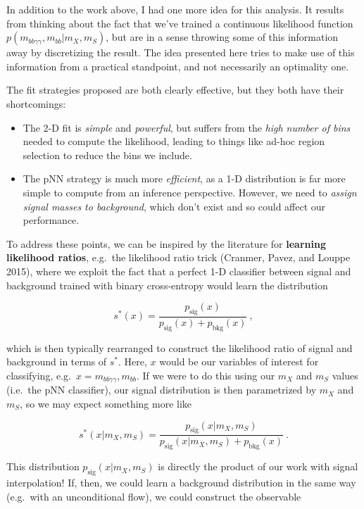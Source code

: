 \documentclass[
  11pt,
  numbers=noendperiod]{book}
\providecommand{\tightlist}{%
  \setlength{\itemsep}{0pt}\setlength{\parskip}{0pt}}\usepackage{longtable,booktabs,array}
\begin{document}
In addition to the work above, I had one more idea for this analysis. It
results from thinking about the fact that we've trained a continuous
likelihood function \(p(m_{bb\gamma\gamma}, m_{bb} | m_X, m_S)\), but
are in a sense throwing some of this information away by discretizing
the result. The idea presented here tries to make use of this
information from a practical standpoint, and not necessarily an
optimality one.

The fit strategies proposed are both clearly effective, but they both
have their shortcomings:

\begin{itemize}
\tightlist
\item
  The 2-D fit is \emph{simple} and \emph{powerful}, but suffers from the
  \emph{high number of bins} needed to compute the likelihood, leading
  to things like ad-hoc region selection to reduce the bins we include.
\item
  The pNN strategy is much more \emph{efficient}, as a 1-D distribution
  is far more simple to compute from an inference perspective. However,
  we need to \emph{assign signal masses to background}, which don't
  exist and so could affect our performance.
\end{itemize}

To address these points, we can be inspired by the literature for
\textbf{learning likelihood ratios}, e.g.~the likelihood ratio trick
(Cranmer, Pavez, and Louppe 2015), where we exploit the fact that a
perfect 1-D classifier between signal and background trained with binary
cross-entropy would learn the distribution

\[
s^*(x) = \frac{p_{\text{sig}}(x)}{p_{\text{sig}}(x) + p_{\text{bkg}}(x)}~,
\]

which is then typically rearranged to construct the likelihood ratio of
signal and background in terms of \(s^*\). Here, \(x\) would be our
variables of interest for classifying,
e.g.~\(x = m_{bb\gamma\gamma}, m_{bb}\). If we were to do this using our
\(m_X\) and \(m_S\) values (i.e.~the pNN classifier), our signal
distribution is then parametrized by \(m_X\) and \(m_S\), so we may
expect something more like

\[
s^*(x | m_X, m_S) = \frac{p_{\text{sig}}(x |m_X, m_S)}{p_{\text{sig}}(x  |m_X, m_S) + p_{\text{bkg}}(x)}~.
\]

This distribution \(p_{\text{sig}}(x | m_X, m_S)\) is directly the
product of our work with signal interpolation! If, then, we could learn
a background distribution in the same way (e.g.~with an unconditional
flow), we could construct the observable
\end{document}
